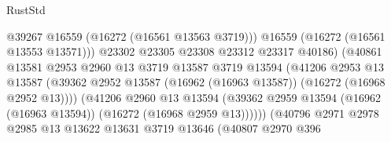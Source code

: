 \begin{lexlean}{RustStd}
\begin{coremodule}
                                              @39267
                                              @16559
                                              (@16272 (@16561 @13563 @3719)))
                                            @16559
                                            (@16272 (@16561 @13553 @13571)))
                                          @23302
                                          @23305
                                          @23308
                                          @23312
                                          @23317
                                          @40186)
                                        (@40861
                                          @13581
                                          @2953
                                          @2960
                                          @13
                                          @3719
                                          @13587
                                          @3719
                                          @13594
                                          (@41206
                                            @2953
                                            @13
                                            @13587
                                            (@39362
                                              @2952
                                              @13587
                                              (@16962 (@16963 @13587))
                                              (@16272 (@16968 @2952 @13))))
                                          (@41206
                                            @2960
                                            @13
                                            @13594
                                            (@39362
                                              @2959
                                              @13594
                                              (@16962 (@16963 @13594))
                                              (@16272 (@16968 @2959 @13))))))
                                      (@40796
                                        @2971
                                        @2978
                                        @2985
                                        @13
                                        @13622
                                        @13631
                                        @3719
                                        @13646
                                        (@40807
                                          @2970
                                          @396

\end{coremodule}
\end{lexlean}

